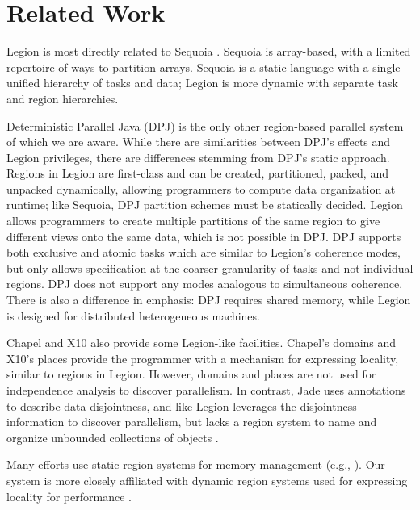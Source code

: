 
\section{Related Work}
\label{sec:related}
Legion is most directly related to Sequoia \cite{Fatahalian06}.  Sequoia is array-based, with
a limited repertoire of ways to partition arrays.  Sequoia is a static language with a single unified hierarchy
of tasks and data; Legion is more dynamic with separate task and region hierarchies.

Deterministic Parallel Java (DPJ) is the only other region-based parallel system of which we are
aware\cite{Bocchino09}.  While there are similarities between DPJ's effects and Legion privileges, 
there are differences stemming from DPJ's static approach.
Regions in Legion are first-class and can be created, partitioned, packed, and unpacked 
dynamically, allowing programmers to compute data organization at runtime; like Sequoia, DPJ
partition schemes must be statically decided.  Legion allows 
programmers to create multiple partitions of the same region to give different 
views onto the same data, which is not possible in DPJ.  DPJ supports both
exclusive and atomic tasks which are similar to Legion's coherence modes, but only
allows specification at the coarser granularity of tasks and not individual regions.
DPJ does not support any modes analogous to simultaneous coherence.
There is also a difference in emphasis: DPJ requires shared memory, while Legion 
is designed for distributed heterogeneous machines.

Chapel \cite{Chamberlain:Chapel} and X10 \cite{X1005} also provide some Legion-like facilities.
Chapel's domains and X10's places provide the programmer with a 
mechanism for expressing locality, similar to regions in Legion.  However, domains
and places are not used for independence analysis to discover parallelism.
In contrast, Jade uses annotations to describe
data disjointness,  and like Legion leverages the disjointness information
to discover parallelism, but lacks a region system to name and organize unbounded collections of objects \cite{Rinard98}.  

Many efforts use static region systems for  memory management (e.g., \cite{Tofte94, Grossman02}).
Our system is more closely affiliated with dynamic region systems used for expressing locality for performance \cite{Gay01}.

